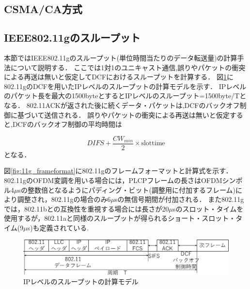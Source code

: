 \documentclass[a4paper,10.5pt]{ltjsarticle}
\begin{document}
\subsection{CSMA/CA方式}

\clearpage
\subsection{IEEE802.11gのスループット}
本節ではIEEE802.11gのスループット(単位時間当たりのデータ転送量)の計算手法について説明する．
ここでは1対1のユニキャスト通信,誤りやパケットの衝突による再送は無いと仮定してDCFにおけるスループットを計算する．
図\ref{fig:11g_packet}に802.11gのDCFを用いたIPレベルのスループットの計算モデルを示す．
IPレベルのパケット長を最大の1500byteとするとIPレベルのスループット=1500byte/Tとなる．
802.11ACKが返された後に続くデータ・パケットは,DCFのバックオフ制御に基づいて送信される．
誤りやパケットの衝突による再送は無いと仮定すると,DCFのバックオフ制御の平均時間は

\begin{equation}
   DIFS+\frac{CW_{min}}{2} \times \text{slottime}
\end{equation}
となる．\par
図\ref{fig:11g_frameformat}に802.11gのフレームフォーマットと計算式を示す．
802.11gのOFDM変調を用いる場合には，PLCPフレームの長さはOFDMシンボル4$\mu$sの整数倍となるようにパディング・ビット(調整用に付加するフレーム)により調整され，802.11gの場合のみ6$\mu$sの無信号期間が付加される．
また802.11gでは，802.11bとの互換性を重視する場合には長さが20$\mu$sのスロット・タイムを使用するが，802.11aと同様のスループットが得られるショート・スロット・タイム(9$\mu$s)も定義されている.


\begin{figure}[H]
  \centering
  \includegraphics[width=\linewidth]{11g_packet.pdf} %
  \caption{IPレベルのスループットの計算モデル}
  \label{fig:11g_packet} %
\end{figure}
\end{document}
